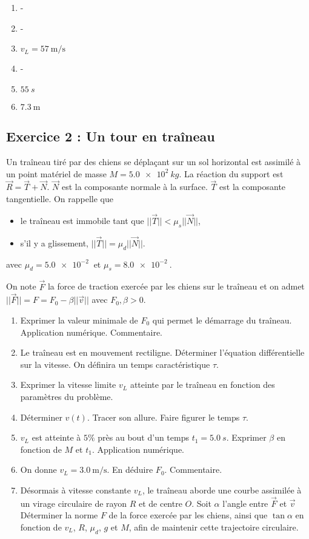 \begin{enumerate}
	\item -
	\item -
	\item $v_L = \SI{57}{\meter\per\second}$
	\item -
	\item $\SI{55}{s}$
	\item $\SI{7.3}{\meter}$
\end{enumerate}

\subsection{Exercice 2 : Un tour en traîneau}

Un traîneau tiré par des chiens se déplaçant sur un sol horizontal est assimilé à un point matériel de masse $M = \SI{5.0e2}{kg}$. La réaction du support est $\vec{R} = \vec{T}+\vec{N}$. $\vec{N}$ est la composante normale à la surface. $\vec{T}$ est la composante tangentielle. On rappelle que 
\begin{itemize}
	\item le traîneau est immobile tant que $||\vec{T}|| < \mu_s ||\vec{N}||$,
	\item s'il y a glissement, $||\vec{T}|| = \mu_d ||\vec{N}||$.
\end{itemize}
avec $\mu_d = \SI{5.0e-2}{}$  et $\mu_s = \SI{8.0e-2}{}$.

On note $\vec{F}$ la force de traction exercée par les chiens sur le traîneau et on admet $||\vec{F}|| = F = F_0 - \beta ||\vec{v}||$ avec $F_0, \beta > 0$.

\begin{enumerate}
	\item Exprimer la valeur minimale de $F_0$ qui permet le démarrage du traîneau. Application numérique. Commentaire.
	\item Le traîneau est en mouvement rectiligne. Déterminer l'équation différentielle sur la vitesse. On définira un temps caractéristique $\tau$.
	\item Exprimer la vitesse limite $v_L$ atteinte par le traîneau en fonction des paramètres du problème.
	\item Déterminer $v(t)$. Tracer son allure. Faire figurer le temps $\tau$.
	\item $v_L$ est atteinte à $5\%$ près au bout d'un temps $t_1 = \SI{5.0}{s}$. Exprimer $\beta$ en fonction de $M$ et $t_1$. Application numérique.
	\item On donne $v_L = \SI{3.0}{\meter\per\second}$. En déduire $F_0$. Commentaire.
	\item Désormais à vitesse constante $v_L$, le traîneau aborde une courbe assimilée à un virage circulaire de rayon $R$ et de centre $O$. Soit $\alpha$ l'angle entre $\vec{F}$ et $\vec{v}$ Déterminer la norme $F$ de la force exercée par les chiens, ainsi que $\tan{\alpha}$ en fonction de $v_L$, $R$, $\mu_d$, $g$ et $M$, afin de maintenir cette trajectoire circulaire.
\end{enumerate}

